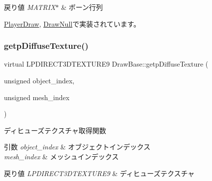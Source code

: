 \begin{DoxyRetVals}{戻り値}
{\em M\+A\+T\+R\+I\+X$\ast$} & ボーン行列 \\
\hline
\end{DoxyRetVals}


\mbox{\hyperlink{class_player_draw_a94e34d6503076f1686302fa376da1c09}{Player\+Draw}}, \mbox{\hyperlink{class_draw_null_a9843abd940623bf84bbb0931f7e21af6}{Draw\+Null}}で実装されています。

\mbox{\label{class_draw_base_a96e94272903d6b663463e0f49246d959}} 
\subsubsection{\texorpdfstring{getp\+Diffuse\+Texture()}{getpDiffuseTexture()}}
{\footnotesize\ttfamily virtual L\+P\+D\+I\+R\+E\+C\+T3\+D\+T\+E\+X\+T\+U\+R\+E9 Draw\+Base\+::getp\+Diffuse\+Texture (\begin{DoxyParamCaption}\item[{unsigned}]{object\+\_\+index,  }\item[{unsigned}]{mesh\+\_\+index }\end{DoxyParamCaption})\hspace{0.3cm}{\ttfamily [pure virtual]}}



ディヒューズテクスチャ取得関数 


\begin{DoxyParams}{引数}
{\em object\+\_\+index} & オブジェクトインデックス \\
\hline
{\em mesh\+\_\+index} & メッシュインデックス \\
\hline
\end{DoxyParams}

\begin{DoxyRetVals}{戻り値}
{\em L\+P\+D\+I\+R\+E\+C\+T3\+D\+T\+E\+X\+T\+U\+R\+E9} & ディヒューズテクスチャ \\
\hline
\end{DoxyRetVals}



